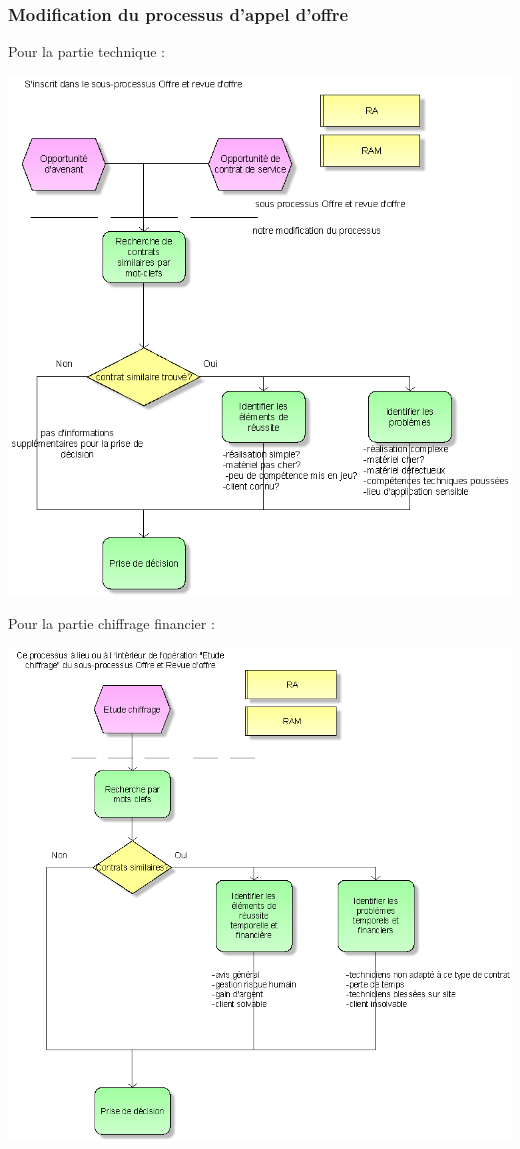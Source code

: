 \begin{itemize}
\subsubsection{Modification du processus d'appel d'offre}
Pour la partie technique :
\begin {center}
\includegraphics[width=\textwidth]{png_cible_fonctionnelle/AideFaisabiliteTechnique.png}
\end {center}

Pour la partie chiffrage financier :
\begin {center}
\includegraphics[width=\textwidth]{png_cible_fonctionnelle/AideChiffrageFinanciere.png}
\end {center}


\end{itemize}
